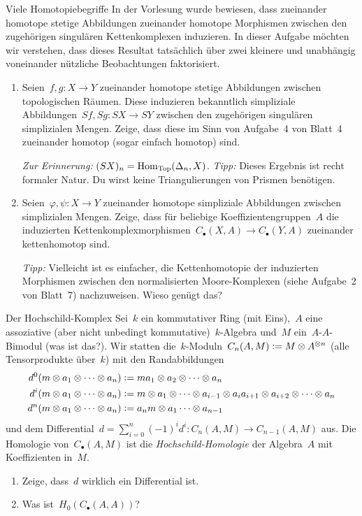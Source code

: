 \documentclass{uebblatt}
\begin{document}
\begin{aufgabe}{Viele Homotopiebegriffe}
In der Vorlesung wurde bewiesen, dass zueinander homotope stetige Abbildungen
zueinander homotope Morphismen zwischen den zugehörigen singulären
Kettenkomplexen induzieren. In dieser Aufgabe möchten wir verstehen, dass
dieses Resultat tatsächlich über zwei kleinere und unabhängig voneinander
nützliche Beobachtungen faktorisiert.
\begin{enumerate}
\item Seien~$f, g : X \to Y$ zueinander homotope stetige Abbildungen zwischen
topologischen Räumen. Diese induzieren bekanntlich simpliziale Abbildungen~$Sf,
Sg : SX \to SY$ zwischen den zugehörigen singulären simplizialen Mengen. Zeige,
dass diese im Sinn von Aufgabe~4 von Blatt~4 zueinander homotop (sogar einfach
homotop) sind.

\emph{Zur Erinnerung:} $(SX)_n = \mathrm{Hom}_{\mathrm{Top}}(\Delta_n,X)$.
\emph{Tipp:} Dieses Ergebnis ist recht formaler Natur. Du wirst keine
Triangulierungen von Prismen benötigen.

\item Seien~$\varphi, \psi : X \to Y$ zueinander homotope simpliziale
Abbildungen zwischen simplizialen Mengen. Zeige, dass für beliebige
Koeffizientengruppen~$A$ die induzierten
Kettenkomplexmorphismen~$C_\bullet(X,A) \to C_\bullet(Y,A)$ zueinander
kettenhomotop sind.

{\tiny
\emph{Tipp:} Vielleicht ist es einfacher, die Kettenhomotopie der induzierten
Morphismen zwischen den normalisierten Moore-Komplexen (siehe Aufgabe~2 von
Blatt~7) nachzuweisen. Wieso genügt das?\par}
\end{enumerate}
\end{aufgabe}

\newpage

\begin{aufgabe}{Der Hochschild-Komplex}
Sei~$k$ ein kommutativer Ring (mit Eins),~$A$ eine assoziative (aber nicht
unbedingt kommutative)~$k$-Algebra und~$M$ ein~$A$-$A$-Bimodul (was ist das?).
Wir statten die~$k$-Moduln~$C_n(A,M) \vcentcolon= M \otimes A^{\otimes n}$ (alle
Tensorprodukte über~$k$) mit den Randabbildungen
\begin{align*}
  d^0(m \otimes a_1 \otimes \cdots \otimes a_n) &\vcentcolon=
    ma_1 \otimes a_2 \otimes \cdots \otimes a_n \\
  d^i(m \otimes a_1 \otimes \cdots \otimes a_n) &\vcentcolon=
    m \otimes a_1 \otimes \cdots \otimes a_{i-1} \otimes a_i a_{i+1} \otimes
    a_{i+2} \otimes \cdots \otimes a_n \\
  d^n(m \otimes a_1 \otimes \cdots \otimes a_n) &\vcentcolon=
    a_n m \otimes a_1 \cdots \otimes a_{n-1}
\end{align*}
und dem Differential~$d = \sum_{i=0}^n (-1)^i d^i : C_n(A,M) \to C_{n-1}(A,M)$
aus. Die Homologie von~$C_\bullet(A,M)$ ist die \emph{Hochschild-Homologie} der
Algebra~$A$ mit Koeffizienten in~$M$.
\begin{enumerate}
\item Zeige, dass~$d$ wirklich ein Differential ist.
\item Was ist~$H_0(C_\bullet(A,A))$?
\end{enumerate}
\end{aufgabe}
\end{document}
